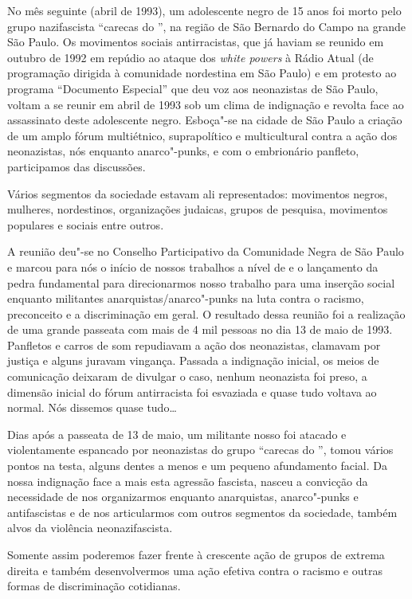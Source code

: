 No mês seguinte (abril de 1993), um adolescente negro de 15 anos foi morto pelo grupo nazifascista ``carecas do '', na região de São Bernardo do Campo na grande São Paulo.
Os movimentos sociais antirracistas, que já haviam se reunido em outubro de 1992 em repúdio ao ataque dos \emph{white powers} à Rádio Atual (de programação dirigida à comunidade nordestina em São Paulo) e em protesto ao programa ``Documento Especial'' que deu voz aos neonazistas de São Paulo, voltam a se reunir em abril de 1993 sob um clima de indignação e revolta face ao assassinato deste adolescente negro. Esboça"-se na cidade de São Paulo a criação de um amplo fórum multiétnico, suprapolítico e multicultural contra a ação dos neonazistas, nós enquanto anarco"-punks, e com o embrionário panfleto, participamos das discussões.

Vários segmentos da sociedade estavam ali representados: movimentos negros, mulheres, nordestinos, organizações judaicas, grupos de pesquisa, movimentos populares e sociais entre outros.

A reunião deu"-se no Conselho Participativo da Comunidade Negra de São Paulo e marcou para nós o início de nossos trabalhos a nível de  e o lançamento da pedra fundamental para direcionarmos nosso trabalho para uma inserção social enquanto militantes anarquistas/anarco"-punks na luta contra o racismo, preconceito e a discriminação em geral.
O resultado dessa reunião foi a realização de uma grande passeata com mais de 4 mil pessoas no dia 13 de maio de 1993. Panfletos e carros de som repudiavam a ação dos neonazistas, clamavam por justiça e alguns juravam vingança.
Passada a indignação inicial, os meios de comunicação deixaram de divulgar o caso, nenhum neonazista foi preso, a dimensão inicial do fórum antirracista foi esvaziada e quase tudo voltava ao normal. Nós dissemos quase tudo\ldots{}

Dias após a passeata de 13 de maio, um militante nosso foi atacado e violentamente espancado por neonazistas do grupo ``carecas do '', tomou vários pontos na testa, alguns dentes a menos e um pequeno afundamento facial.
Da nossa indignação face a mais esta agressão fascista, nasceu a convicção da necessidade de nos organizarmos enquanto anarquistas, anarco"-punks e antifascistas e de nos articularmos com outros segmentos da sociedade, também alvos da violência neonazifascista.

Somente assim poderemos fazer frente à crescente ação de grupos de extrema direita e também desenvolvermos uma ação efetiva contra o racismo e outras formas de discriminação cotidianas.

